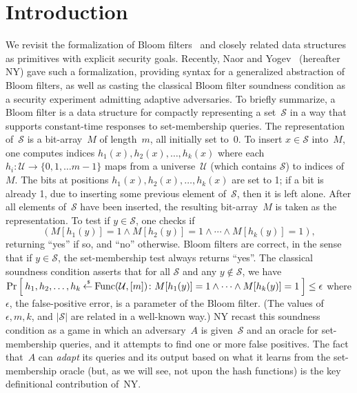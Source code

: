 \section{Introduction}
\label{sec:intro}
We revisit the formalization of Bloom filters~\cite{bloom1970space} and closely
related data structures as primitives with explicit security goals.
Recently, Naor and Yogev~\cite{naor2015bloom} (hereafter NY) gave such a
formalization, providing syntax for a generalized abstraction of
Bloom filters, as well as casting the classical Bloom filter
soundness condition as a security experiment admitting adaptive
adversaries.  To briefly summarize, a Bloom filter is a data
structure for compactly representing a set~$\mathcal{S}$ in a way
that supports constant-time responses to set-membership queries. The
representation of~$\mathcal{S}$ is a bit-array~$M$ of length~$m$,
all initially set to~0.  To insert $x \in \mathcal{S}$ into~$M$, one
computes indices $h_1(x),h_2(x),\ldots,h_k(x)$ where each $h_i
\colon \mathcal{U} \to \{0,1,\ldots m-1\}$ maps from a
universe~$\mathcal{U}$ (which contains $\mathcal{S}$) to indices
of~$M$.  The bits at positions $h_1(x),h_2(x),\ldots,h_k(x)$ are set
to 1; if a bit is already 1, due to inserting some previous element
of~$\mathcal{S}$, then it is left alone.  After all elements
of~$\mathcal{S}$ have been inserted, the resulting bit-array~$M$ is
taken as the representation.  To test if $y \in \mathcal{S}$, one
checks if
\[
(M[h_1(y)]=1 \wedge M[h_2(y)]=1 \wedge \cdots \wedge M[h_k(y)]=1),
\]
returning ``yes'' if so, and ``no'' otherwise. Bloom
filters are correct, in the sense that if $y \in \mathcal{S}$, the
set-membership test always returns ``yes''.  The classical soundness
condition asserts that for all $\mathcal{S}$ and any $y
\notin\mathcal{S}$, we have $\Pr\left[\: h_1,h_2,\ldots,h_k {\:\stackrel{{\scriptscriptstyle \hspace{0.2em}\$}} {\leftarrow}\:}
\mathrm{Func}(\mathcal{U},[m])\colon M[h_1(y)]=1 \wedge \cdots
\wedge M[h_k(y)]=1 \:\right] \leq \epsilon$ where $\epsilon$, the
false-positive error, is a parameter of the Bloom filter.  (The
values of~$\epsilon,m,k$, and $|\mathcal{S}|$ are related in a
well-known way.) NY recast this soundness condition as a game in
which an adversary~$A$ is given~$\mathcal{S}$ and an oracle for
set-membership queries, and it attempts to find one or more false
positives. The fact that~$A$ can \emph{adapt} its queries and its
output based on what it learns from the set-membership oracle (but,
as we will see, not upon the hash functions) is the key definitional
contribution of~NY.

